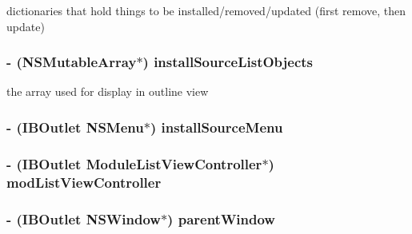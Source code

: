 dictionaries that hold things to be installed/removed/updated (first remove, then update) \hypertarget{interface_module_manage_view_controller_ae49cc77a92bcaab294c2da615bb85d34}{
\subsubsection[{install\-Source\-List\-Objects}]{\setlength{\rightskip}{0pt plus 5cm}-\/ (N\-S\-Mutable\-Array$\ast$) install\-Source\-List\-Objects\hspace{0.3cm}{\ttfamily [protected]}}}\label{interface_module_manage_view_controller_ae49cc77a92bcaab294c2da615bb85d34}
the array used for display in outline view \hypertarget{interface_module_manage_view_controller_a79edfe4f7877b55d0d6b77ebbeca5f30}{
\subsubsection[{install\-Source\-Menu}]{\setlength{\rightskip}{0pt plus 5cm}-\/ (I\-B\-Outlet N\-S\-Menu$\ast$) install\-Source\-Menu\hspace{0.3cm}{\ttfamily [protected]}}}\label{interface_module_manage_view_controller_a79edfe4f7877b55d0d6b77ebbeca5f30}
\hypertarget{interface_module_manage_view_controller_a8c43ea19910fa60600028ab23f7298c8}{
\subsubsection[{mod\-List\-View\-Controller}]{\setlength{\rightskip}{0pt plus 5cm}-\/ (I\-B\-Outlet {\bf Module\-List\-View\-Controller}$\ast$) mod\-List\-View\-Controller\hspace{0.3cm}{\ttfamily [protected]}}}\label{interface_module_manage_view_controller_a8c43ea19910fa60600028ab23f7298c8}
\hypertarget{interface_module_manage_view_controller_a16e8470294ab6af9bb98d8336adcdc36}{
\subsubsection[{parent\-Window}]{\setlength{\rightskip}{0pt plus 5cm}-\/ (I\-B\-Outlet N\-S\-Window$\ast$) parent\-Window\hspace{0.3cm}{\ttfamily [protected]}}}\label{interface_module_manage_view_controller_a16e8470294ab6af9bb98d8336adcdc36}

